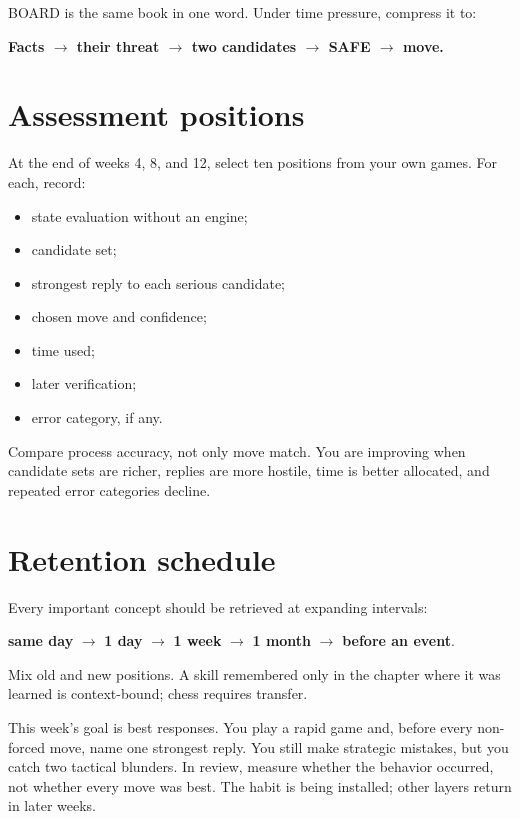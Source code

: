 BOARD is the same book in one word. Under time pressure, compress it to:

\begin{center}
\textbf{Facts $\rightarrow$ their threat $\rightarrow$ two candidates $\rightarrow$ SAFE $\rightarrow$ move.}
\end{center}

\section{Assessment positions}
At the end of weeks 4, 8, and 12, select ten positions from your own games. For each, record:

\begin{itemize}[leftmargin=1.4em]
\item state evaluation without an engine;
\item candidate set;
\item strongest reply to each serious candidate;
\item chosen move and confidence;
\item time used;
\item later verification;
\item error category, if any.
\end{itemize}

Compare process accuracy, not only move match. You are improving when candidate sets are richer, replies are more hostile, time is better allocated, and repeated error categories decline.

\section{Retention schedule}
Every important concept should be retrieved at expanding intervals:

\begin{center}
\textbf{same day} $\rightarrow$ \textbf{1 day} $\rightarrow$ \textbf{1 week} $\rightarrow$ \textbf{1 month} $\rightarrow$ \textbf{before an event}.
\end{center}

Mix old and new positions. A skill remembered only in the chapter where it was learned is context-bound; chess requires transfer.

\begin{workedbox}[title={Worked example: one-focus game}]
This week's goal is best responses. You play a rapid game and, before every non-forced move, name one strongest reply. You still make strategic mistakes, but you catch two tactical blunders. In review, measure whether the behavior occurred, not whether every move was best. The habit is being installed; other layers return in later weeks.
\end{workedbox}

